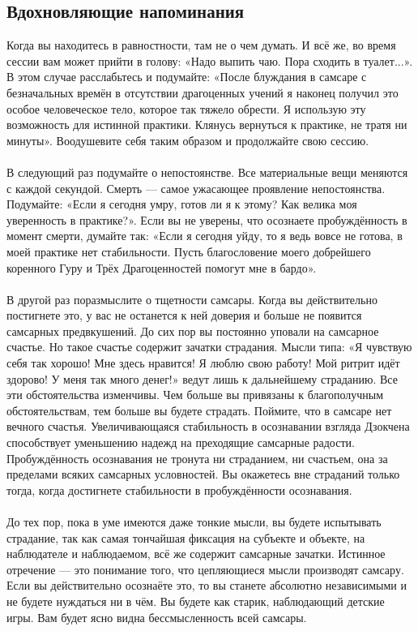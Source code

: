\subsection{Вдохновляющие напоминания}
Когда вы находитесь в равностности, там не о чем думать. И всё же, во время сессии вам может прийти в голову: «Надо выпить чаю. Пора сходить в туалет...». В этом случае расслабьтесь и подумайте: «После блуждания в самсаре с безначальных времён в отсутствии драгоценных учений я наконец получил это особое человеческое тело, которое так тяжело обрести. Я использую эту возможность для истинной практики. Клянусь вернуться к практике, не тратя ни минуты». Воодушевите себя таким образом и продолжайте свою сессию.
\newpage
\\ \\ В следующий раз подумайте о непостоянстве. Все материальные вещи меняются с каждой секундой. Смерть — самое ужасающее проявление непостоянства. Подумайте: «Если я сегодня умру, готов ли я к этому? Как велика моя уверенность в практике?». Если вы не уверены, что осознаете пробуждённость в момент смерти, думайте так: «Если я сегодня уйду, то я ведь вовсе не готова, в моей практике нет стабильности. Пусть благословение моего добрейшего коренного Гуру и Трёх Драгоценностей помогут мне в бардо».
\\ \\ В другой раз поразмыслите о тщетности самсары. Когда вы действительно постигнете это, у вас не останется к ней доверия и больше не появится самсарных предвкушений. До сих пор вы постоянно уповали на самсарное счастье. Но такое счастье содержит зачатки страдания. Мысли типа: «Я чувствую себя так хорошо! Мне здесь нравится! Я люблю свою работу! Мой ритрит идёт здорово! У меня так много денег!» ведут лишь к дальнейшему страданию. Все эти обстоятельства изменчивы. Чем больше вы привязаны к благополучным обстоятельствам, тем больше вы будете страдать. Поймите, что в самсаре нет вечного счастья. Увеличивающаяся стабильность в осознавании взгляда Дзокчена способствует уменьшению надежд на преходящие самсарные радости. Пробуждённость осознавания не тронута ни страданием, ни счастьем, она за пределами всяких самсарных условностей. Вы окажетесь вне страданий только тогда, когда достигнете стабильности в пробуждённости осознавания.
\\ \\ До тех пор, пока в уме имеются даже тонкие мысли, вы будете испытывать страдание, так как самая тончайшая фиксация на субъекте и объекте, на наблюдателе и наблюдаемом, всё же содержит самсарные зачатки. Истинное отречение — это понимание того, что цепляющиеся мысли производят самсару. Если вы действительно осознаёте это, то вы станете абсолютно независимыми и не будете нуждаться ни в чём. Вы будете как старик, наблюдающий детские игры. Вам будет ясно видна бессмысленность всей самсары.
